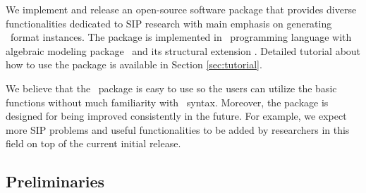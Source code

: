 We implement and release an open-source software package that provides diverse functionalities dedicated to SIP research with main emphasis on generating \smps\ format instances. The package is implemented in \julia\ programming language with algebraic modeling package \jump\ and its structural extension \structjump. Detailed tutorial about how to use the package is available in Section \ref{sec:tutorial}. 

We believe that the \siplibtwo\ package is easy to use so the users can utilize the basic functions without much familiarity with \julia\ syntax. Moreover, the package is designed for being improved consistently in the future. For example, we expect more SIP problems and useful functionalities to be added by researchers in this field on top of the current initial release.
\subsection{Preliminaries}
